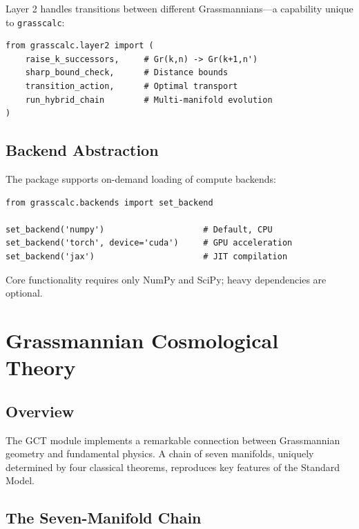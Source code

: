 \documentclass[11pt,a4paper]{article}
\begin{document}
Layer 2 handles transitions between different Grassmannians---a capability unique to \texttt{grasscalc}:

\begin{lstlisting}[caption={Layer 2 transition operations}]
from grasscalc.layer2 import (
    raise_k_successors,     # Gr(k,n) -> Gr(k+1,n')
    sharp_bound_check,      # Distance bounds
    transition_action,      # Optimal transport
    run_hybrid_chain        # Multi-manifold evolution
)
\end{lstlisting}

\subsection{Backend Abstraction}

The package supports on-demand loading of compute backends:

\begin{lstlisting}[caption={Backend switching}]
from grasscalc.backends import set_backend

set_backend('numpy')                    # Default, CPU
set_backend('torch', device='cuda')     # GPU acceleration
set_backend('jax')                      # JIT compilation
\end{lstlisting}

Core functionality requires only NumPy and SciPy; heavy dependencies are optional.

\section{Grassmannian Cosmological Theory}
\label{sec:gct}

\subsection{Overview}

The GCT module implements a remarkable connection between Grassmannian geometry and fundamental physics. A chain of seven manifolds, uniquely determined by four classical theorems, reproduces key features of the Standard Model.

\subsection{The Seven-Manifold Chain}
\end{document}
